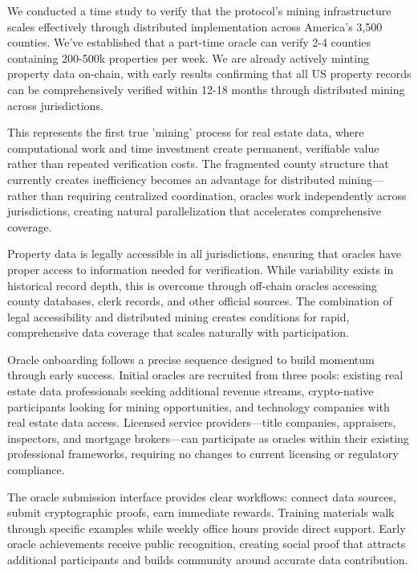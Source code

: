 We conducted a time study to verify that the protocol's mining infrastructure scales effectively through distributed implementation across America's 3,500 counties. We've established that a part-time oracle can verify 2-4 counties containing 200-500k properties per week. We are already actively minting property data on-chain, with early results confirming that all US property records can be comprehensively verified within 12-18 months through distributed mining across jurisdictions.

This represents the first true 'mining' process for real estate data, where computational work and time investment create permanent, verifiable value rather than repeated verification costs. The fragmented county structure that currently creates inefficiency becomes an advantage for distributed mining---rather than requiring centralized coordination, oracles work independently across jurisdictions, creating natural parallelization that accelerates comprehensive coverage.

Property data is legally accessible in all jurisdictions, ensuring that oracles have proper access to information needed for verification. While variability exists in historical record depth, this is overcome through off-chain oracles accessing county databases, clerk records, and other official sources. The combination of legal accessibility and distributed mining creates conditions for rapid, comprehensive data coverage that scales naturally with participation.

Oracle onboarding follows a precise sequence designed to build momentum through early success. Initial oracles are recruited from three pools: existing real estate data professionals seeking additional revenue streams, crypto-native participants looking for mining opportunities, and technology companies with real estate data access. Licensed service providers---title companies, appraisers, inspectors, and mortgage brokers---can participate as oracles within their existing professional frameworks, requiring no changes to current licensing or regulatory compliance.

The oracle submission interface provides clear workflows: connect data sources, submit cryptographic proofs, earn immediate rewards. Training materials walk through specific examples while weekly office hours provide direct support. Early oracle achievements receive public recognition, creating social proof that attracts additional participants and builds community around accurate data contribution.

